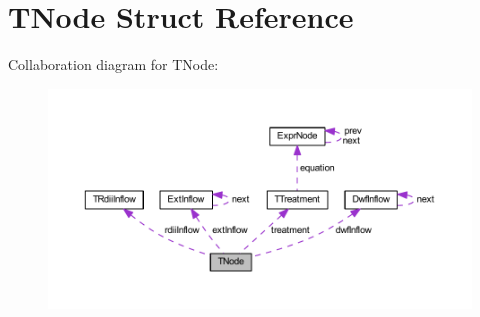 \hypertarget{struct_t_node}{}\section{T\+Node Struct Reference}
\label{struct_t_node}


Collaboration diagram for T\+Node\+:
\nopagebreak
\begin{figure}[H]
\begin{center}
\leavevmode
\includegraphics[width=350pt]{da/d4e/struct_t_node__coll__graph}
\end{center}
\end{figure}
